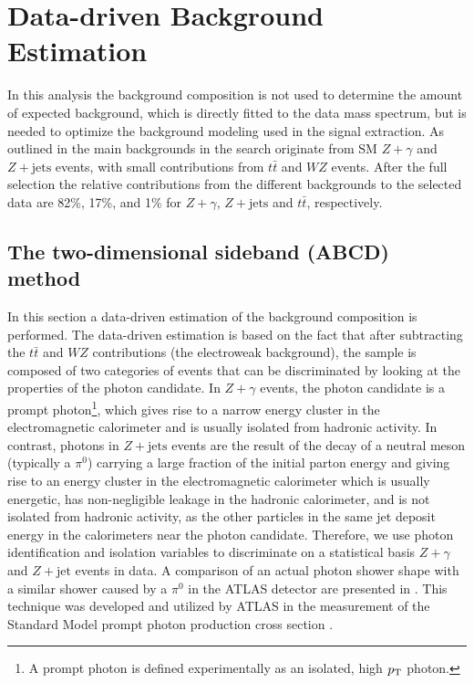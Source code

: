 \section{Data-driven Background Estimation}
\label{sec:compare}

In this analysis the background composition is not used to determine the amount of
expected background, which is directly fitted to the data mass spectrum, but is
needed to optimize the background modeling used in the signal extraction. As outlined
in  the main backgrounds in the \HToZg search originate
from SM $Z+\gamma$ and $Z+\text{jets}$ events, with 
small contributions from $t \bar t$ and $WZ$ events.
After the full selection the relative contributions from the different backgrounds
to the selected data are 82\%, 17\%, and 1\% for $Z+\gamma$, $Z+\text{jets}$ and
$t\bar t$, respectively.

\subsection{The two-dimensional sideband (ABCD) method}
In this section a data-driven estimation of the background composition is
performed. The data-driven estimation is based on the fact that after subtracting
the $t \bar t$ and $WZ$ contributions (the electroweak background), 
the sample is composed of two categories
of events that can be discriminated by looking at the properties of the 
photon candidate. In $Z+\gamma$ events, the photon candidate is a 
prompt photon\footnote{A prompt photon is defined experimentally as an
isolated, high $p_{\mathrm{T}}$ photon.},
which gives rise to a narrow energy cluster in the electromagnetic calorimeter and
is usually isolated from hadronic activity. In contrast, photons in $Z+\text{jets}$
events are the result of the decay of a neutral meson (typically a $\pi^0$)
carrying a large fraction of the initial parton energy and giving rise to an
energy cluster in the electromagnetic calorimeter which is usually energetic,
has non-negligible leakage in the hadronic calorimeter, and is not isolated from
hadronic activity, as the other particles in the same jet deposit energy in the
calorimeters near the photon candidate. Therefore, we use photon identification
and isolation variables to discriminate on a statistical basis $Z+\gamma$ and
$Z+\text{jet}$ events in data. A comparison of an actual photon shower shape
with a similar shower caused by a $\pi^0$ in the ATLAS detector are presented
in . This technique was developed and utilized
by ATLAS in the measurement of the Standard Model prompt photon production
cross section \cite{Aad:2010sp}. 

